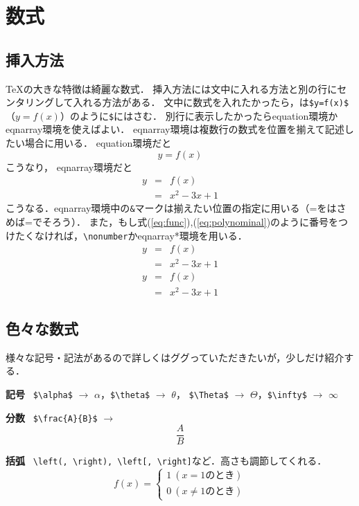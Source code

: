 \section{数式}
\subsection{挿入方法}
{\TeX}の大きな特徴は綺麗な数式．
挿入方法には文中に入れる方法と別の行にセンタリングして入れる方法がある．
文中に数式を入れたかったら，は\verb+$y=f(x)$+（$y=f(x)$）のように\verb+$+にはさむ．
別行に表示したかったらequation環境かeqnarray環境を使えばよい．
eqnarray環境は複数行の数式を位置を揃えて記述したい場合に用いる．
equation環境だと
\begin{equation}
  y=f(x)
\end{equation}
こうなり，
eqnarray環境だと
\begin{eqnarray}
  y&=&f(x)     \label{eq:func} \\
  &=&x^2-3x+1  \label{eq:polynominal}
\end{eqnarray}
こうなる．eqnarray環境中の\verb+&+マークは揃えたい位置の指定に用いる（=をはさめば=でそろう）．
また，もし式(\ref{eq:func}),(\ref{eq:polynominal})のように番号をつけたくなければ，\verb+\nonumber+かeqnarray*環境を用いる．
\begin{eqnarray}
  y&=&f(x) \nonumber \\
  &=&x^2-3x+1
\end{eqnarray}
\begin{eqnarray*}
  y&=&f(x) \\
  &=&x^2-3x+1
\end{eqnarray*}

\subsection{色々な数式}
様々な記号・記法があるので詳しくはググっていただきたいが，少しだけ紹介する．

\noindent \textbf{記号} \
\verb+$\alpha$+ $\rightarrow$ $\alpha$，\verb+$\theta$+ $\rightarrow$ $\theta$，
\verb+$\Theta$+ $\rightarrow$ $\Theta$，\verb+$\infty$+ $\rightarrow$  $\infty$

\noindent \textbf{分数} \
\verb+$\frac{A}{B}$+ $\rightarrow$
\begin{equation*}
  \frac{A}{B}
\end{equation*}

\noindent \textbf{括弧} \
\verb+\left(, \right), \left[, \right]+など．高さも調節してくれる．
\begin{equation*}
  f(x)=\left \{ \begin{array}{l}
    1 \ (x=1のとき) \\
    0 \ (x\neq1のとき)
  \end{array}
  \right.
\end{equation*}

